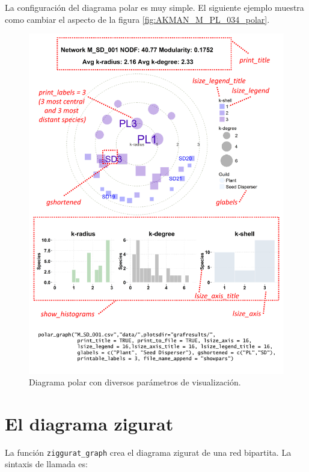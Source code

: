\clearpage
La configuración del diagrama polar es muy simple. El siguiente ejemplo muestra como cambiar el aspecto de la figura \ref{fig:AKMAN_M_PL_034_polar}.

\begin{figure}[h!]
\centering
\includegraphics[scale=0.8]{ManFigs/polar_params.pdf}
\caption {Diagrama polar con diversos parámetros de visualización.}
\label{fig:AKMAN_polar_params}
\end{figure}

\clearpage
\section{El diagrama zigurat}

\noindent La función \texttt{ziggurat\_graph} crea el diagrama zigurat de una red bipartita. La sintaxis de llamada es:

